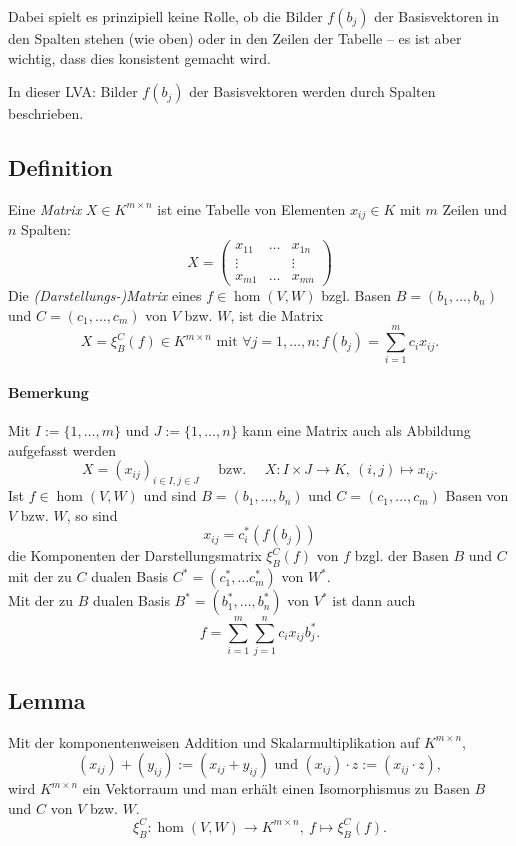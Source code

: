  	Dabei spielt es prinzipiell keine Rolle, ob die Bilder $ f(b_j) $ der Basisvektoren in den Spalten stehen (wie oben) oder in den Zeilen der Tabelle -- es ist aber wichtig, dass dies konsistent gemacht wird.

 	In dieser LVA: Bilder $ f(b_j) $ der Basisvektoren werden durch Spalten beschrieben.

\subsection{Definition}
	\begin{Definition}[Matrix]
		Eine \emph{Matrix} $ X\in K^{m\times n} $ ist eine Tabelle von Elementen $ x_{ij}\in K $ mit $ m $ Zeilen und $ n $ Spalten:
		\[
			X =
			\begin{pmatrix}
				x_{11} & \dots & x_{1n} \\
				\vdots &       & \vdots \\
				x_{m1} & \dots & x_{mn}
			\end{pmatrix}
		\]
		Die \emph{(Darstellungs-)Matrix} eines $ f\in \hom(V,W) $ bzgl. Basen $ B= (b_1,\dots,b_n) $ und $ C=(c_1,\dots,c_m) $ von $ V $ bzw. $ W $, ist die Matrix
		\[
			X = \xi^C_B(f)\in K^{m\times n}\text{ mit }\forall j=1,\dots,n:f(b_j) = \sum_{i=1}^{m}c_ix_{ij}.
		\]
	\end{Definition}

	\paragraph{Bemerkung}
		Mit $ I:= \{1,\dots,m\} $ und $ J:= \{1,\dots,n\} $ kann eine Matrix auch als Abbildung aufgefasst werden
		\[
			X = (x_{ij})_{i\in I,j\in J} \quad\text{ bzw. }\quad X:I\times J\to K,\ (i,j)\mapsto x_{ij}.
		\]
		Ist $ f\in \hom(V,W) $ und sind $ B=(b_1,\dots,b_n) $ und $ C=(c_1,\dots,c_m) $ Basen von $ V $ bzw. $ W $, so sind
		\[
			x_{ij} = c_i^*(f(b_j))
		\]
		die Komponenten der Darstellungsmatrix $ \xi_B^C(f) $ von $ f $ bzgl. der Basen $ B $ und $ C $ mit der zu $ C $ dualen Basis $ C^*=(c_1^*,\dots c_m^*) $ von $ W^* $.\\
		Mit der zu $ B $ dualen Basis $ B^*= (b_1^*,\dots,b_n^*) $ von $ V^* $ ist dann auch
		\[
			f=\sum_{i=1}^{m}\sum_{j=1}^{n} c_ix_{ij}b_j^*.
		\]
\subsection{Lemma}
	\begin{Lemma}
		Mit der komponentenweisen Addition und Skalarmultiplikation auf $ K^{m\times n} $,
		\[
			(x_{ij})+(y_{ij}) := (x_{ij}+y_{ij}) \text{ und } (x_{ij})\cdot z := (x_{ij}\cdot z),
		\]
		wird $ K^{m\times n} $ ein Vektorraum und man erhält einen Isomorphismus zu Basen $B$ und $C$ von $V$ bzw. $W$.
		\[
			\xi_B^C:\hom(V,W)\to K^{m\times n},\ f\mapsto \xi_B^C(f).
		\]
	\end{Lemma}

